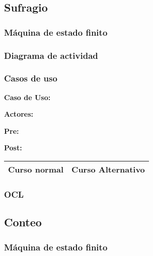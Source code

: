 \subsection{Sufragio}

\subsubsection{Máquina de estado finito}

\subsubsection{Diagrama de actividad}


\begin{figure}[H]
\centering
\end{figure}


\subsubsection{Casos de uso}


\textbf{Caso de Uso: }

\textbf{Actores:} 

\textbf{Pre:} 

\textbf{Post:}
\begin{table}[h!]
	
 \begin{tabular}{|p{7.5cm} | p{7.5cm}|} 
 \hline
 \textbf{Curso normal} & \textbf{Curso Alternativo} \\
 \hline

 \end{tabular}

\end{table}


\subsubsection{OCL}

\subsection{Conteo}

\subsubsection{Máquina de estado finito}

